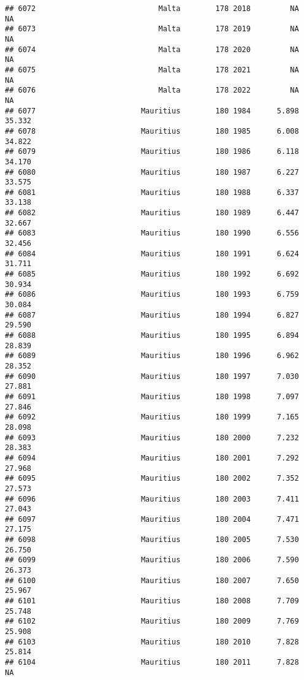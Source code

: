 \documentclass[
]{article}
\begin{document}
\begin{verbatim}
## 6072                            Malta        178 2018         NA         NA
## 6073                            Malta        178 2019         NA         NA
## 6074                            Malta        178 2020         NA         NA
## 6075                            Malta        178 2021         NA         NA
## 6076                            Malta        178 2022         NA         NA
## 6077                        Mauritius        180 1984      5.898     35.332
## 6078                        Mauritius        180 1985      6.008     34.822
## 6079                        Mauritius        180 1986      6.118     34.170
## 6080                        Mauritius        180 1987      6.227     33.575
## 6081                        Mauritius        180 1988      6.337     33.138
## 6082                        Mauritius        180 1989      6.447     32.667
## 6083                        Mauritius        180 1990      6.556     32.456
## 6084                        Mauritius        180 1991      6.624     31.711
## 6085                        Mauritius        180 1992      6.692     30.934
## 6086                        Mauritius        180 1993      6.759     30.084
## 6087                        Mauritius        180 1994      6.827     29.590
## 6088                        Mauritius        180 1995      6.894     28.839
## 6089                        Mauritius        180 1996      6.962     28.352
## 6090                        Mauritius        180 1997      7.030     27.881
## 6091                        Mauritius        180 1998      7.097     27.846
## 6092                        Mauritius        180 1999      7.165     28.098
## 6093                        Mauritius        180 2000      7.232     28.383
## 6094                        Mauritius        180 2001      7.292     27.968
## 6095                        Mauritius        180 2002      7.352     27.573
## 6096                        Mauritius        180 2003      7.411     27.043
## 6097                        Mauritius        180 2004      7.471     27.175
## 6098                        Mauritius        180 2005      7.530     26.750
## 6099                        Mauritius        180 2006      7.590     26.373
## 6100                        Mauritius        180 2007      7.650     25.967
## 6101                        Mauritius        180 2008      7.709     25.748
## 6102                        Mauritius        180 2009      7.769     25.908
## 6103                        Mauritius        180 2010      7.828     25.814
## 6104                        Mauritius        180 2011      7.828         NA

\end{verbatim}
\end{document}

